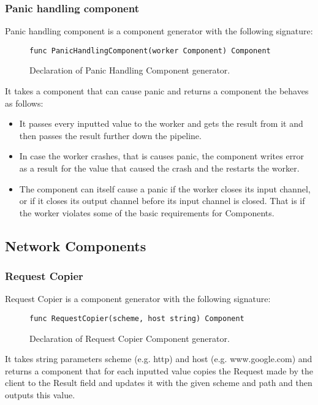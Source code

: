 \documentclass[12pt,a4paper]{article}
\begin{document}
\subsubsection{Panic handling component}
Panic handling component is a component generator with the following signature:

\begin{figure}[h]
\centering
\begin{lstlisting}
func PanicHandlingComponent(worker Component) Component
\end{lstlisting}
\caption[scale=1.0]{Declaration of Panic Handling Component generator.}
\label{fig:panicHandler}
\end{figure}

It takes a component that can cause panic and returns a component the behaves as follows:
\begin{itemize}
	\item It passes every inputted value to the worker and gets the result from it and then passes
				the result further down the pipeline.
	\item In case the worker crashes, that is causes panic, the component writes error as a result 
				for the value that caused the crash and the restarts the worker.
	\item The component can itself cause a panic if the worker closes its input channel, or if 
				it closes its output channel before its input channel is closed. That is if the worker
				violates some of the basic requirements for Components.
\end{itemize}

\subsection{Network Components}
\subsubsection{Request Copier}
Request Copier is a component generator with the following signature:

\begin{figure}[h]
\centering
\begin{lstlisting}
func RequestCopier(scheme, host string) Component
\end{lstlisting}
\caption[scale=1.0]{Declaration of Request Copier Component generator.}
\label{fig:RequestCopier}
\end{figure}

It takes string parameters scheme (e.g. http) and host (e.g. www.google.com) 
and returns a component that for each inputted value copies the Request made 
by the client to the Result field and updates it with the given scheme and 
path and then outputs this value.
\end{document}

